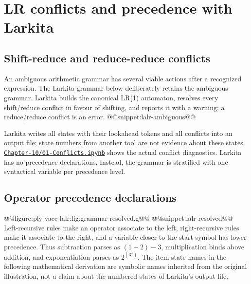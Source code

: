 \chapter{LR conflicts and precedence with Larkita}
\section{Shift-reduce and reduce-reduce conflicts}
An ambiguous arithmetic grammar has several viable actions after a recognized expression.
The Larkita grammar below deliberately retains the ambiguous grammar.  Larkita builds the canonical LR(1) automaton, resolves every shift/reduce conflict in favour of shifting, and reports it with a warning; a reduce/reduce conflict is an error.
@@snippet:lalr-ambiguous@@

Larkita writes all states with their lookahead tokens and all conflicts into an output file; state numbers from another tool are not evidence about these states.
\href{../../Chapter-10/01-Conflicts.ipynb}{\nolinkurl{Chapter-10/01-Conflicts.ipynb}} shows the actual conflict diagnostics.
Larkita has no precedence declarations.  Instead, the grammar is stratified with one syntactical variable per precedence level.

\section{Operator precedence declarations \label{section:operator-precedence}}
@@figure:ply-yacc-lalr:fig:grammar-resolved.g@@
@@snippet:lalr-resolved@@
Left-recursive rules make an operator associate to the left, right-recursive rules make it associate to the right, and a variable closer to the start symbol has lower precedence.
Thus subtraction parses as $(1-2)-3$, multiplication binds above addition, and exponentiation parses as $2^{(3^4)}$.
The item-state names in the following mathematical derivation are symbolic names inherited from the original illustration, not a claim about the numbered states of Larkita's output file.
